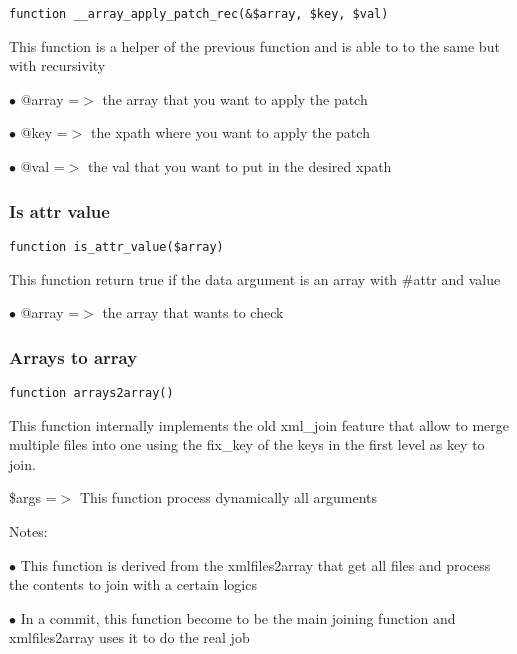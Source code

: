 \documentclass[a4paper]{article}
\begin{document}
\begin{lstlisting}
function __array_apply_patch_rec(&$array, $key, $val)
\end{lstlisting}

This function is a helper of the previous function and is able to to the
same but with recursivity

\begin{compactitem}
\item[\color{myblue}$\bullet$] @array =$>$ the array that you want to apply the patch
\item[\color{myblue}$\bullet$] @key   =$>$ the xpath where you want to apply the patch
\item[\color{myblue}$\bullet$] @val   =$>$ the val that you want to put in the desired xpath
\end{compactitem}

\hypertarget{toc63}{}
\subsubsection{Is attr value}

\begin{lstlisting}
function is_attr_value($array)
\end{lstlisting}

This function return true if the data argument is an array with \#attr and value

\begin{compactitem}
\item[\color{myblue}$\bullet$] @array =$>$ the array that wants to check
\end{compactitem}

\hypertarget{toc64}{}
\subsubsection{Arrays to array}

\begin{lstlisting}
function arrays2array()
\end{lstlisting}

This function internally implements the old xml\_join feature that allow to merge
multiple files into one using the fix\_key of the keys in the first level as key
to join.

\$args =$>$ This function process dynamically all arguments

Notes:

\begin{compactitem}
\item[\color{myblue}$\bullet$] This function is derived from the xmlfiles2array that get all files and process
  the contents to join with a certain logics
\item[\color{myblue}$\bullet$] In a commit, this function become to be the main joining function and xmlfiles2array
  uses it to do the real job
\end{compactitem}
\end{document}
